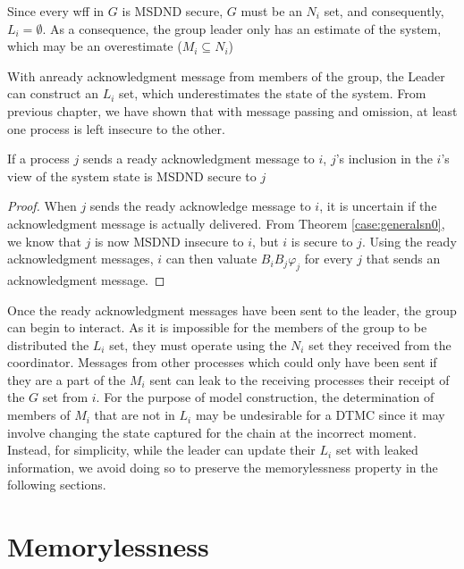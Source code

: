 Since every wff in $G$ is MSDND secure, $G$ must be an $N_i$ set, and consequently, $L_i = \emptyset$.
As a consequence, the group leader only has an estimate of the system, which may be an overestimate ($M_i \subseteq N_i$)

With anready acknowledgment message from members of the group, the Leader can construct an $L_i$ set, which underestimates the state of the system.
From previous chapter, we have shown that with message passing and omission, at least one process is left insecure to the other.

\begin{thm}
    If a process $j$ sends a ready acknowledgment message to $i$, $j$'s inclusion in the $i$'s view of the system state is MSDND secure to $j$
\end{thm}

\begin{proof}
When $j$ sends the ready acknowledge message to $i$, it is uncertain if the acknowledgment message is actually delivered.
From Theorem \ref{case:generalsn0}, we know that $j$ is now MSDND insecure to $i$, but $i$ is secure to $j$.
Using the ready acknowledgment messages, $i$ can then valuate $B_i B_j \varphi_j$ for every $j$ that sends an acknowledgment message.
\end{proof}

Once the ready acknowledgment messages have been sent to the leader, the group can begin to interact.
As it is impossible for the members of the group to be distributed the $L_i$ set, they must operate using the $N_i$ set they received from the coordinator.
Messages from other processes which could only have been sent if they are a part of the $M_i$ sent can leak to the receiving processes their receipt of the $G$ set from $i$.
For the purpose of model construction, the determination of members of $M_i$ that are not in $L_i$ may be undesirable for a \ac{DTMC} since it may involve changing the state captured for the chain at the incorrect moment.
Instead, for simplicity, while the leader can update their $L_i$ set with leaked information, we avoid doing so to preserve the memorylessness property in the following sections.



\section{Memorylessness}

